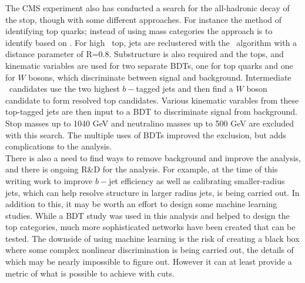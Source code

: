 The CMS experiment also has conducted a search for the all-hadronic decay of the stop, though with some different approaches.  For instance the method of identifying top quarks; instead of using mass categories the approach is to identify based on \pt.  For high \pt\  top, jets are reclustered with the \antikt\ algorithm with a distance parameter of R=0.8.  Substructure is also required and the tops, and kinematic variables are used for two separate BDTs, one for top quarks and one for $W$ bosons, which discriminate between signal and background.  Intermediate \pt\ candidates use the two highest $b-$tagged jets and then find a $W$ boson candidate to form resolved top candidates.  Various kinematic varables from these top-tagged jets are then input to a BDT to discriminate signal from background.  Stop masses up to 1040 GeV and neutralino masses up to 500 GeV are excluded with this search.  The multiple uses of BDTs improved the exclusion, but adds complications to the analysis.\\

There is also a need to find ways to remove background and improve the analysis, and there is ongoing R\&D for the analysis.  For example, at the time of this writing work to improve $b-$jet efficiency as well as calibrating smaller-radius jets, which can help resolve structure in larger radius jets, is being carried out.  In addition to this, it may be worth an effort to design some machine learning studies.  While a BDT study was used in this analysis and helped to design the top categories, much more sophisticated networks have been created that can be tested.  The downside of using machine learning is the risk of creating a black box where some complex nonlinear discrimination is being carried out, the details of which may be nearly impossible to figure out.  However it can at least provide a metric of what is possible to achieve with cuts.








